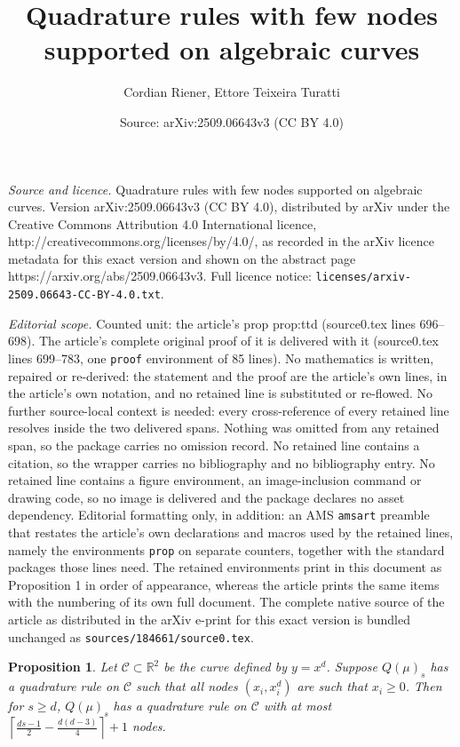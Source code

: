 \documentclass[10pt,a4paper]{amsart}
\title{Quadrature rules with few nodes supported on algebraic curves}
\author{Cordian Riener, Ettore Teixeira Turatti}
\date{Source: arXiv:2509.06643v3 (CC BY 4.0)}
\newtheorem{prop}{Proposition}
\newcommand{\R}{\mathbb{R}}
\begin{document}
\maketitle

\noindent\emph{Source and licence.} Quadrature rules with few nodes supported on algebraic curves. Version arXiv:2509.06643v3 (CC BY 4.0), distributed by arXiv under the Creative Commons Attribution 4.0 International licence, http://creativecommons.org/licenses/by/4.0/, as recorded in the arXiv licence metadata for this exact version and shown on the abstract page https://arxiv.org/abs/2509.06643v3. Full licence notice: \texttt{licenses/arxiv-2509.06643-CC-BY-4.0.txt}.\par\smallskip

\noindent\textit{Editorial scope.} Counted unit: the article's prop prop:ttd (source0.tex lines 696--698). The article's complete original proof of it is delivered with it (source0.tex lines 699--783, one \texttt{proof} environment of 85 lines). No mathematics is written, repaired or re-derived: the statement and the proof are the article's own lines, in the article's own notation, and no retained line is substituted or re-flowed.  No further source-local context is needed: every cross-reference of every retained line resolves inside the two delivered spans.  Nothing was omitted from any retained span, so the package carries no omission record.  No retained line contains a citation, so the wrapper carries no bibliography and no bibliography entry.  No retained line contains a figure environment, an image-inclusion command or drawing code, so no image is delivered and the package declares no asset dependency.  Editorial formatting only, in addition: an AMS \texttt{amsart} preamble that restates the article's own declarations and macros used by the retained lines, namely the environments \texttt{prop} on separate counters, together with the standard packages those lines need.  The retained environments print in this document as Proposition 1 in order of appearance, whereas the article prints the same items with the numbering of its own full document.  The complete native source of the article as distributed in the arXiv e-print for this exact version is bundled unchanged as \texttt{sources/184661/source0.tex}.
\begin{prop}\label{prop:ttd}
     Let $\mathcal C\subset \R^2$ be the curve defined by $y=x^d$. {Suppose $Q(\mu)_s$ has a quadrature rule on $\mathcal C$ such that all nodes $(x_i,x_i^d)$ are such that $x_i\geq 0$}. Then for $s\geq d$, $Q(\mu)_s$ has a quadrature rule on $\mathcal C$ with at most $\left\lceil \frac{ds-1}{2}-\frac{d(d-3)}{4} \right\rceil+1$ nodes.
 \end{prop}
\end{document}
